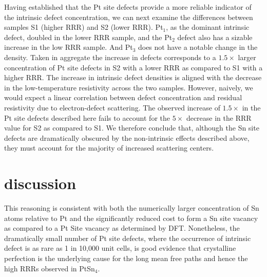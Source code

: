 Having established that the Pt site defects provide a more reliable indicator of the intrinsic defect concentration, we can next examine the differences between samples S1 (higher RRR) and S2 (lower RRR). Pt$_1$, as the dominant intrinsic defect, doubled in the lower RRR sample, and the Pt$_2$ defect also has a sizable increase in the low RRR sample. And Pt$_3$ does not have a notable change in the density. Taken in aggregate the increase in defects corresponds to a $1.5\times$ larger concentration of Pt site defects in S2 with a lower RRR as compared to S1 with a higher RRR.  The increase in intrinsic defect densities is aligned with the decrease in the low-temperature resistivity across the two samples. However, naively, we would expect a linear correlation between defect concentration and residual resistivity due to electron-defect scattering. The observed increase of $1.5\times$ in the Pt site defects described here fails to account for the $5\times$ decrease in the RRR value for S2 as compared to S1. We therefore conclude that, although the Sn site defects are dramatically obscured by the non-intrinsic effects described above, they must account for the majority of increased scattering centers. 

\section{discussion}
This reasoning is consistent with both the numerically larger concentration of Sn atoms relative to Pt and the significantly reduced cost to form a Sn site vacancy as compared to a Pt Site vacancy as determined by DFT. Nonetheless, the dramatically small number of Pt site defects, where the occurrence of intrinsic defect is as rare as 1 in 10,000 unit cells, is good evidence that crystalline perfection is the underlying cause for the long mean free paths and hence the high RRRs observed in PtSn$_4$. 